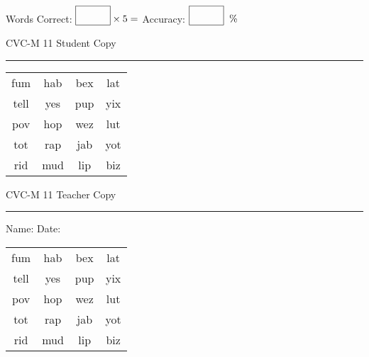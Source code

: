 \documentclass{memoir}
\begin{document}
\small

Words Correct: $\fbox{\phantom{\huge 100}} \times 5 = $ Accuracy: $\fbox{\phantom{\huge 100}}\;\; \%$ 

\vfill

\newpage


\footnotesize \noindent
CVC-M 11 \hfill Student Copy
\smallskip
\hrule

\Large

\setlength{\tabcolsep}{14pt}
\def\arraystretch{2}

{\selectfont


\begin{vplace}[0.5]
\begin{center}
\begin{tabular}{cccc}
fum & hab & bex & lat \\
tell & yes & pup & yix \\
pov & hop & wez & lut \\
tot & rap & jab & yot \\
rid & mud & lip & biz \\
\end{tabular}
\end{center}
\end{vplace}

}

\newpage

\footnotesize \noindent
CVC-M 11 \hfill Teacher Copy
\smallskip
\hrule

\small

\vfill

\noindent
Name: \underline{\hspace{1.75in}} \hfill Date: \underline{\hspace{1in}}

\Large

{\selectfont


\begin{vplace}[0.5]
\begin{center}
\begin{tabular}{cccc}
fum & hab & bex & lat \\
tell & yes & pup & yix \\
pov & hop & wez & lut \\
tot & rap & jab & yot \\
rid & mud & lip & biz \\
\end{tabular}
\end{center}
\end{vplace}



}
\end{document}
